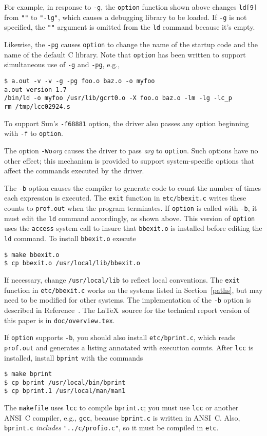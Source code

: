For example, in response to \verb|-g|, the \verb|option| function shown above
changes \verb|ld[9]| from \verb|""| to \verb|"-lg"|, which causes
a debugging library to be loaded. If \verb|-g| is not specified,
the \verb|""| argument is omitted from the \verb|ld| command
because it's empty.

Likewise, the \verb|-pg| causes \verb|option| to change the name
of the startup code and the name of the default C library. Note that
\verb|option| has been written to support simultaneous use
of \verb|-g| and \verb|-pg|, e.g.,
\begin{verbatim}
$ a.out -v -v -g -pg foo.o baz.o -o myfoo
a.out version 1.7
/bin/ld -o myfoo /usr/lib/gcrt0.o -X foo.o baz.o -lm -lg -lc_p
rm /tmp/lcc02924.s
\end{verbatim}

To support Sun's \verb|-f68881| option, the driver also
passes any option beginning with \verb|-f| to \verb|option|.

The option \verb|-Wo|{\it arg\/} causes the driver to pass {\it arg\/}
to \verb|option|. Such options have no other effect; this mechanism
is provided to support system-specific options that affect the
commands executed by the driver.

The \verb|-b| option causes the compiler to generate
code to count the number of times each expression is executed.
The \verb|exit| function in \verb|etc/bbexit.c| writes these
counts to \verb|prof.out| when the program terminates.
If \verb|option| is called with \verb|-b|,
it must edit the \verb|ld| command accordingly,
as shown above. This version of \verb|option| uses
the \verb|access| system call to insure that \verb|bbexit.o| is installed before
editing the \verb|ld| command. To install \verb|bbexit.o| execute
\begin{verbatim}
$ make bbexit.o
$ cp bbexit.o /usr/local/lib/bbexit.o
\end{verbatim}
If necessary, change \verb|/usr/local/lib| to reflect local conventions.
The \verb|exit| function in \verb|etc/bbexit.c| works on the
systems listed in Section~\ref{paths}, but may need to be modified for other systems.
The implementation of the \verb|-b| option is described
in Reference~\cite{fraser:hanson:91b}.
The \LaTeX\ source for the technical report version of this paper
is in \verb|doc/overview.tex|.

If \verb|option| supports \verb|-b|, you should also
install \verb|etc/bprint.c|, which reads \verb|prof.out|
and generates a listing annotated with execution counts.
After \verb|lcc| is installed, install \verb|bprint| with the commands
\begin{verbatim}
$ make bprint
$ cp bprint /usr/local/bin/bprint
$ cp bprint.1 /usr/local/man/man1
\end{verbatim}
The \verb|makefile| uses \verb|lcc| to compile \verb|bprint.c|;
you must use \verb|lcc| or another ANSI~C compiler, e.g., \verb|gcc|,
because \verb|bprint.c| is written in ANSI~C.
Also, \verb|bprint.c| {\em includes} \verb|"../c/profio.c"|, so it must
be compiled in \verb|etc|.


